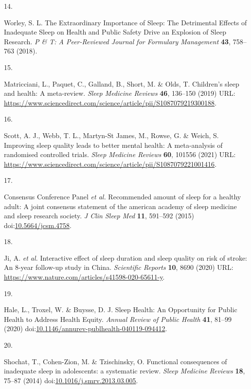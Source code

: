 \documentclass[
  9pt,
]{scrbook}
\newlength{\cslhangindent}
\newlength{\csllabelwidth}
\newlength{\cslentryspacingunit} %
\newenvironment{CSLReferences}[2] %
 {%
  \setlength{\parindent}{0pt}
  \ifodd #1
  \let\oldpar\par
  \def\par{\hangindent=\cslhangindent\oldpar}
  \fi
  \setlength{\parskip}{#2\cslentryspacingunit}
 }%
 {}
\newcommand{\CSLLeftMargin}[1]{\parbox[t]{\csllabelwidth}{#1}}
\newcommand{\CSLRightInline}[1]{\parbox[t]{\linewidth - \csllabelwidth}{#1}\break}
\begin{document}
\begin{CSLReferences}{0}{0}
\leavevmode{}%
\CSLLeftMargin{14. }%
\CSLRightInline{Worley, S. L. The Extraordinary Importance of Sleep: The
Detrimental Effects of Inadequate Sleep on Health and Public Safety
Drive an Explosion of Sleep Research. \emph{P \& T: A Peer-Reviewed
Journal for Formulary Management} \textbf{43}, 758--763 (2018).}

\leavevmode{}%
\CSLLeftMargin{15. }%
\CSLRightInline{Matricciani, L., Paquet, C., Galland, B., Short, M. \&
Olds, T. Children's sleep and health: A meta-review. \emph{Sleep
Medicine Reviews} \textbf{46}, 136--150 (2019) URL:
\url{https://www.sciencedirect.com/science/article/pii/S1087079219300188}.}

\leavevmode{}%
\CSLLeftMargin{16. }%
\CSLRightInline{Scott, A. J., Webb, T. L., Martyn-St James, M., Rowse,
G. \& Weich, S. Improving sleep quality leads to better mental health: A
meta-analysis of randomised controlled trials. \emph{Sleep Medicine
Reviews} \textbf{60}, 101556 (2021) URL:
\url{https://www.sciencedirect.com/science/article/pii/S1087079221001416}.}

\leavevmode{}%
\CSLLeftMargin{17. }%
\CSLRightInline{Consensus Conference Panel \emph{et al.} Recommended
amount of sleep for a healthy adult: A joint consensus statement of the
american academy of sleep medicine and sleep research society. \emph{J
Clin Sleep Med} \textbf{11}, 591--592 (2015)
doi:\href{https://doi.org/10.5664/jcsm.4758}{10.5664/jcsm.4758}.}

\leavevmode{}%
\CSLLeftMargin{18. }%
\CSLRightInline{Ji, A. \emph{et al.} Interactive effect of sleep
duration and sleep quality on risk of stroke: An 8-year follow-up study
in China. \emph{Scientific Reports} \textbf{10}, 8690 (2020) URL:
\url{https://www.nature.com/articles/s41598-020-65611-y}.}

\leavevmode{}%
\CSLLeftMargin{19. }%
\CSLRightInline{Hale, L., Troxel, W. \& Buysse, D. J. Sleep Health: An
Opportunity for Public Health to Address Health Equity. \emph{Annual
Review of Public Health} \textbf{41}, 81--99 (2020)
doi:\href{https://doi.org/10.1146/annurev-publhealth-040119-094412}{10.1146/annurev-publhealth-040119-094412}.}

\leavevmode{}%
\CSLLeftMargin{20. }%
\CSLRightInline{Shochat, T., Cohen-Zion, M. \& Tzischinsky, O.
Functional consequences of inadequate sleep in adolescents: a systematic
review. \emph{Sleep Medicine Reviews} \textbf{18}, 75--87 (2014)
doi:\href{https://doi.org/10.1016/j.smrv.2013.03.005}{10.1016/j.smrv.2013.03.005}.}


\end{CSLReferences}
\end{document}

